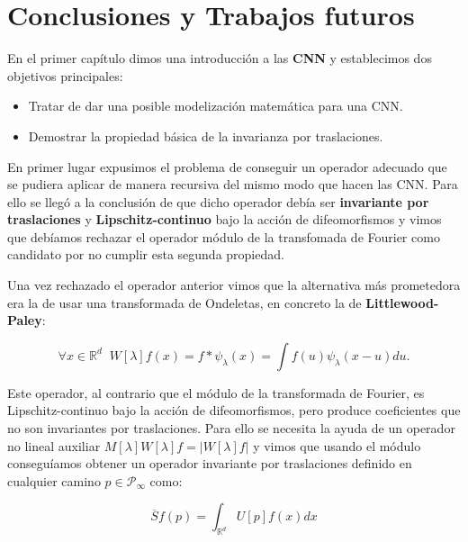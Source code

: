 

\chapter{Conclusiones y Trabajos futuros}

\noindent En el primer capítulo dimos una introducción a las \textbf{CNN} y establecimos dos objetivos principales:

\begin{itemize}
  \item Tratar de dar una posible modelización matemática para una CNN.
  \item Demostrar la propiedad básica de la invarianza por traslaciones. 
\end{itemize}


\medskip

\noindent En primer lugar expusimos el problema de conseguir un operador adecuado que se pudiera aplicar de manera recursiva del mismo modo que hacen las CNN. Para ello se llegó a la conclusión de que dicho operador debía ser \textbf{invariante por traslaciones} y \textbf{Lipschitz-continuo} bajo la acción de difeomorfismos y vimos que debíamos rechazar el operador módulo de la transfomada de Fourier como candidato por no cumplir esta segunda propiedad. 

\medskip

\noindent Una vez rechazado el operador anterior vimos que la alternativa más prometedora era la de usar una transformada de Ondeletas, en concreto la de \textbf{Littlewood-Paley}:

\begin{equation}
  \forall x \in  \mathbb{R}^d \;\; W[\lambda]f(x)= f \ast \psi_\lambda(x)=\int f(u)\psi_\lambda(x-u) du .
\end{equation}

\noindent Este operador, al contrario que el módulo de la transformada de Fourier, es Lipschitz-continuo bajo la acción de difeomorfismos, pero produce coeficientes que no son invariantes por traslaciones. Para ello se necesita la ayuda de un operador no lineal auxiliar $M[\lambda]W[\lambda]f=|W[\lambda]f|$ y vimos que usando el módulo conseguíamos obtener un operador invariante por traslaciones definido en cualquier camino $p \in \mathcal{P}_\infty$ como:

\begin{equation}
  \overline{S}f(p)=\int_{\mathbb{R}^d}U[p]f(x)dx 
\end{equation} 

